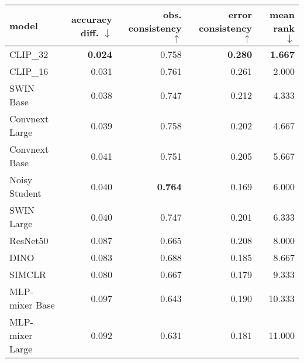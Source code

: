 \begin{tabular}{lrrrr}
\toprule
          model & accuracy diff. $\downarrow$ & obs. consistency $\uparrow$ & error consistency $\uparrow$ & mean rank $\downarrow$ \\
\midrule
       CLIP\_32 &              \textbf{0.024} &                       0.758 &               \textbf{0.280} &         \textbf{1.667} \\
       CLIP\_16 &                       0.031 &                       0.761 &                        0.261 &                  2.000 \\
      SWIN Base &                       0.038 &                       0.747 &                        0.212 &                  4.333 \\
 Convnext Large &                       0.039 &                       0.758 &                        0.202 &                  4.667 \\
  Convnext Base &                       0.041 &                       0.751 &                        0.205 &                  5.667 \\
  Noisy Student &                       0.040 &              \textbf{0.764} &                        0.169 &                  6.000 \\
     SWIN Large &                       0.040 &                       0.747 &                        0.201 &                  6.333 \\
       ResNet50 &                       0.087 &                       0.665 &                        0.208 &                  8.000 \\
           DINO &                       0.083 &                       0.688 &                        0.185 &                  8.667 \\
         SIMCLR &                       0.080 &                       0.667 &                        0.179 &                  9.333 \\
 MLP-mixer Base &                       0.097 &                       0.643 &                        0.190 &                 10.333 \\
MLP-mixer Large &                       0.092 &                       0.631 &                        0.181 &                 11.000 \\
\bottomrule
\end{tabular}

